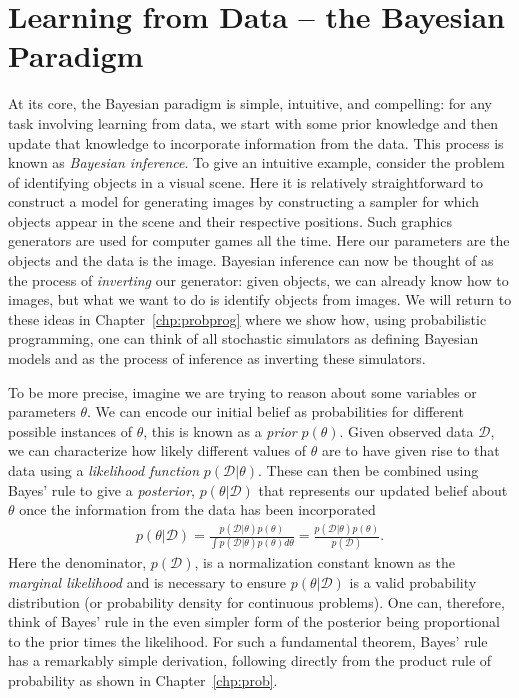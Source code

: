 
\section{Learning from Data -- the Bayesian Paradigm}
\label{sec:bayes:paradigm}

At its core, the Bayesian paradigm is simple, intuitive, and compelling: for any task involving
learning from data, we start with some prior knowledge and then update that knowledge to
incorporate information from the data.  This process is known as \emph{Bayesian inference}.
To give an intuitive example, consider the problem of identifying objects in
a visual scene.  Here it is relatively straightforward to construct a model for generating images by
constructing a sampler for which objects appear in the scene and their respective positions.  Such
graphics generators are used for computer games all the time.  Here our parameters are the objects and
the data is the image.  Bayesian inference can now be thought of as the process of \emph{inverting} our generator:
given objects, we can already know how to images, but what we want to do is identify objects from images.  We will return
to these ideas in Chapter~\ref{chp:probprog} where we show how, using probabilistic programming,
one can think of all stochastic simulators as defining Bayesian models and as the process of inference as
inverting these simulators.

To be more precise, imagine we are trying to reason about some variables
or parameters $\theta$.  We can encode our initial belief as probabilities for different
possible instances of $\theta$, this is known as a \emph{prior} $p(\theta)$.  Given observed data
$\mathcal{D}$, we can characterize how likely different values of $\theta$ are to have given rise
to that data using a \emph{likelihood function} $p(\mathcal{D}|\theta)$.  These can then be
combined using Bayes' rule to give a \emph{posterior}, $p(\theta | \mathcal{D})$ that 
represents our updated belief about $\theta$ once the information from the data has been
incorporated
\begin{align}
	\label{eq:bayes:bayes}
	p(\theta | \mathcal{D}) = \frac{p(\mathcal{D} | \theta)p(\theta)}{\int p(\mathcal{D} | \theta)p(\theta) d\theta} 
	= \frac{p(\mathcal{D} | \theta)p(\theta)}{p(\mathcal{D})}.
\end{align}
Here the denominator, $p(\mathcal{D})$, is a normalization constant known as the \emph{marginal
	likelihood} and is necessary to ensure $p(\theta | \mathcal{D})$ is a valid probability distribution
(or probability density for continuous problems).  One can, therefore, think of Bayes' rule in the even
simpler form of the posterior being proportional to the prior times the likelihood.
For such a fundamental theorem, Bayes' rule has a remarkably simple derivation, following directly
from the product rule of probability as shown in Chapter~\ref{chp:prob}.

